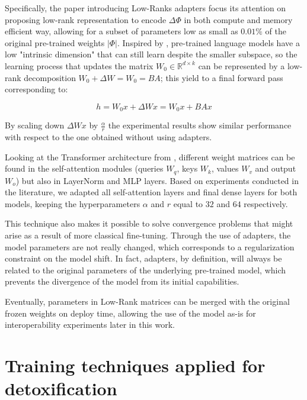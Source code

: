 Specifically, the paper introducing Low-Ranks adapters focus its attention on proposing low-rank representation to encode $\Delta \Phi$ in both compute and memory efficient way, allowing for a subset of parameters low as small as $0.01 \%$ of the original pre-trained weights $|\Phi|$. Inspired by \citet{aghajanyan-etal-2021-intrinsic}, pre-trained language models have a low "intrinsic dimension" that can still learn despite the smaller subspace, so the learning process that updates the matrix $W_0 \in \mathbb{R}^{d \times k}$ can be represented by a low-rank decomposition $W_0 + \Delta W = W_0 = BA$; this yield to a final forward pass corresponding to: 

\begin{equation*}
    h = W_0 x + \Delta Wx = W_0 x + BAx
\end{equation*}

By scaling down $\Delta W x$ by $\frac{\alpha}{r}$ the experimental results show similar performance with respect to the one obtained without using adapters. 

Looking at the Transformer architecture from \citet{DBLP:journals/corr/VaswaniSPUJGKP17}, different weight matrices can be found in the self-attention modules (queries $W_q$, keys $W_k$, values $W_v$ and output $W_o$) but also in LayerNorm and MLP layers. Based on experiments conducted in the literature, we adapted all self-attention layers and final dense layers for both models, keeping the hyperparameters $\alpha$ and $r$ equal to $32$ and $64$ respectively.

This technique also makes it possible to solve convergence problems that might arise as a result of more classical fine-tuning. Through the use of adapters, the model parameters are not really changed, which corresponds to a regularization constraint on the model shift. In fact, adapters, by definition, will always be related to the original parameters of the underlying pre-trained model, which prevents the divergence of the model from its initial capabilities.


Eventually, parameters in Low-Rank matrices can be merged with the original frozen weights on deploy time, allowing the use of the model as-is for interoperability experiments later in this work. 


\section{Training techniques applied for detoxification}
\label{section:training-detoxification}

